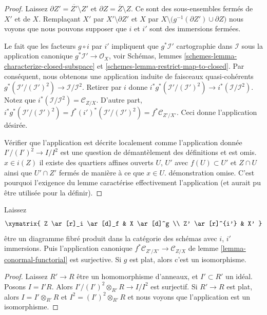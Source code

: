 \begin{proof}
Laissez $\partial Z' = \overline{Z'} \setminus Z'$ et $\partial Z = \overline{Z} \setminus Z$. Ce sont des sous-ensembles fermés de $X'$ et de $X$. Remplaçant $X'$ par $X' \setminus \partial Z'$ et $X$ par $X \setminus \big(g^{-1}(\partial Z') \cup \partial Z\big)$ nous voyons que nous pouvons supposer que $i$ et $i'$ sont des immersions fermées.

\medskip\noindent
Le fait que les facteurs $g \circ i$ par $i'$ impliquent que $g^*\mathcal{I}'$ cartographie dans $\mathcal{I}$ sous la application canonique $g^*\mathcal{I}' \to \mathcal{O}_X$, voir Schémas, lemmes \ref{schemes-lemma-characterize-closed-subspace} et \ref{schemes-lemma-restrict-map-to-closed}. Par conséquent, nous obtenons une application induite de faisceaux quasi-cohérents $g^*(\mathcal{I}'/(\mathcal{I}')^2) \to \mathcal{I}/\mathcal{I}^2$. Retirer par $i$ donne $i^*g^*(\mathcal{I}'/(\mathcal{I}')^2) \to i^*(\mathcal{I}/\mathcal{I}^2)$. Notez que $i^*(\mathcal{I}/\mathcal{I}^2) = \mathcal{C}_{Z/X}$. D'autre part, $i^*g^*(\mathcal{I}'/(\mathcal{I}')^2) =
f^*(i')^*(\mathcal{I}'/(\mathcal{I}')^2) = f^*\mathcal{C}_{Z'/X'}$. Ceci donne l'application désirée.

\medskip\noindent

Vérifier que l'application est décrite localement comme l'application donnée
$I'/(I')^2 \to I/I^2$ est une question de démantèlement des définitions et est omis.
$x \in i(Z)$ il existe des quartiers affines ouverts $U$, $U'$
avec $f(U) \subset U'$ et $Z \cap U$ ainsi que $U' \cap Z'$
fermés de manière à ce que $x \in U$. démonstration omise. C'est pourquoi l'exigence du lemme caractérise effectivement l'application (et aurait pu être utilisée pour la définir).

\end{proof}

\begin{lemma}

\label{lemma-conormal-functorial-flat}
Laissez $$
\xymatrix{
Z \ar[r]_i \ar[d]_f & X \ar[d]^g \\
Z' \ar[r]^{i'} & X'
}
$$ être un diagramme fibré produit dans la catégorie des schémas avec $i$, $i'$ immersions. Puis l'application canonique $f^*\mathcal{C}_{Z'/X'} \to \mathcal{C}_{Z/X}$ de lemme \ref{lemma-conormal-functorial} est surjective. Si $g$ est plat, alors c'est un isomorphisme.
\end{lemma}

\begin{proof}
Laissez $R' \to R$ être un homomorphisme d'anneaux, et $I' \subset R'$ un idéal. Posons $I = I'R$. Alors $I'/(I')^2 \otimes_{R'} R \to I/I^2$ est surjectif. Si $R' \to R$ est plat, alors $I = I' \otimes_{R'} R$ et $I^2 = (I')^2 \otimes_{R'} R$ et nous voyons que l'application est un isomorphisme.
\end{proof}

